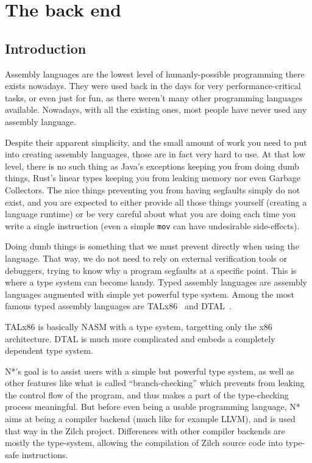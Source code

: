 \part{The back end}\label{part:nstar}


\chapter{Introduction}\label{chap:nstar-abstract}

Assembly languages are the lowest level of humanly-possible programming there exists nowadays. They were used back in the days for very performance-critical tasks, or even just for fun, as there weren't many other programming languages available. Nowadays, with all the existing ones, most people have never used any assembly language.

Despite their apparent simplicity, and the small amount of work you need to put into creating assembly languages, those are in fact very hard to use. At that low level, there is no such thing as Java's exceptions keeping you from doing dumb things, Rust's linear types keeping you from leaking memory nor even Garbage Collectors. The nice things preventing you from having segfaults simply do not exist, and you are expected to either provide all those things yourself (creating a language runtime) or be very careful about what you are doing each time you write a single instruction (even a simple \texttt{mov} can have undesirable side-effects).

Doing dumb things is something that we must prevent directly when using the language. That way, we do not need to rely on external verification tools or debuggers, trying to know why a program segfaults at a specific point.
This is where a type system can become handy. Typed assembly languages are assembly languages augmented with simple yet powerful type system. Among the most famous typed assembly languages are TALx86~\cite{TALx86} and DTAL~\cite{DTAL}.

TALx86 is basically NASM with a type system, targetting only the x86 architecture. DTAL is much more complicated and embeds a completely dependent type system.

\vspace{\baselineskip}

N*'s goal is to assist users with a simple but powerful type system, as well as other features like what is called ``branch-checking'' which prevents from leaking the control flow of the program, and thus makes a part of the type-checking process meaningful.
But before even being a usable programming language, N* aims at being a compiler backend (much like for example LLVM), and is used that way in the Zilch project. Differences with other compiler backends are mostly the type-system, allowing the compilation of Zilch source code into type-safe instructions.

